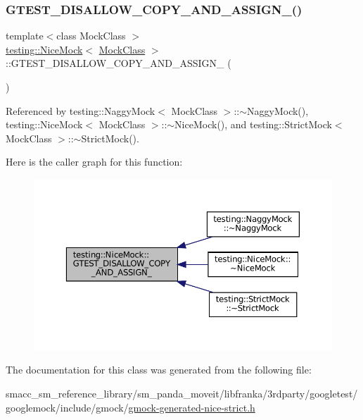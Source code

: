 \subsubsection{\texorpdfstring{G\+T\+E\+S\+T\+\_\+\+D\+I\+S\+A\+L\+L\+O\+W\+\_\+\+C\+O\+P\+Y\+\_\+\+A\+N\+D\+\_\+\+A\+S\+S\+I\+G\+N\+\_\+()}{GTEST\_DISALLOW\_COPY\_AND\_ASSIGN\_()}}
{\footnotesize\ttfamily template$<$class Mock\+Class $>$ \\
\hyperlink{classtesting_1_1NiceMock}{testing\+::\+Nice\+Mock}$<$ \hyperlink{classMockClass}{Mock\+Class} $>$\+::G\+T\+E\+S\+T\+\_\+\+D\+I\+S\+A\+L\+L\+O\+W\+\_\+\+C\+O\+P\+Y\+\_\+\+A\+N\+D\+\_\+\+A\+S\+S\+I\+G\+N\+\_\+ (\begin{DoxyParamCaption}\item[{\hyperlink{classtesting_1_1NiceMock}{Nice\+Mock}$<$ \hyperlink{classMockClass}{Mock\+Class} $>$}]{ }\end{DoxyParamCaption})\hspace{0.3cm}{\ttfamily [private]}}



Referenced by testing\+::\+Naggy\+Mock$<$ Mock\+Class $>$\+::$\sim$\+Naggy\+Mock(), testing\+::\+Nice\+Mock$<$ Mock\+Class $>$\+::$\sim$\+Nice\+Mock(), and testing\+::\+Strict\+Mock$<$ Mock\+Class $>$\+::$\sim$\+Strict\+Mock().

Here is the caller graph for this function\+:
\nopagebreak
\begin{figure}[H]
\begin{center}
\leavevmode
\includegraphics[width=350pt]{classtesting_1_1NiceMock_aee46eca734708818a8af94624eb512dd_icgraph}
\end{center}
\end{figure}


The documentation for this class was generated from the following file\+:\begin{DoxyCompactItemize}
\item 
smacc\+\_\+sm\+\_\+reference\+\_\+library/sm\+\_\+panda\+\_\+moveit/libfranka/3rdparty/googletest/googlemock/include/gmock/\hyperlink{gmock-generated-nice-strict_8h}{gmock-\/generated-\/nice-\/strict.\+h}\end{DoxyCompactItemize}
